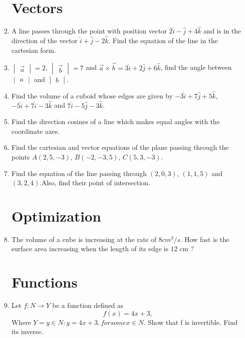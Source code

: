 \documentclass[2pt,-letter paper]{article}
\providecommand{\mydet}[1]{\ensuremath{\begin{vmatrix}#1\end{vmatrix}}}
\providecommand{\brak}[1]{\ensuremath{\left(#1\right)}}
\begin{document}
\begin{enumerate}
\section{Vectors}
\item A line passes through the point with position vector $2\hat{i} - \hat{j} + 4\hat{k}$ and is in the direction of the vector $\hat{i} + \hat{j} -2\hat{k}.$ Find the equation of the line in the cartesian form.
\item $\mydet{\overrightarrow{a}}= 2$, $\mydet{\overrightarrow{b}} = 7$ and  $\overrightarrow{a} \times \overrightarrow{b} = 3\hat{i} + 2\hat{j} + 6\hat{k}$, find the angle between $\mydet{a}$ and $\mydet{b}$.
\item Find the volume of a cuboid whose edges are given by $-3\hat{i} + 7\hat{j} + 5\hat{k}$, $-5\hat{i} + 7\hat{i} - 3\hat{k}$ and $7\hat{i} -5\hat{j} -3\hat{k}$.
\item Find the direction cosines of a line which makes equal angles with the coordinate axes.
\item Find the cartesian and vector equations of the plane passing through the points $A\brak{2,5,-3}$, $B\brak{-2,-3,5}$, $C\brak{5,3,-3}$.
\item Find the equation of the line passing through $\brak{2, 0, 3}$, $\brak{1, 1, 5}$ and $\brak{3, 2, 4}$.Also, find their point of intersection.
\section{Optimization}
\item The volume of a cube is increasing at the rate of $8 cm^3/s$. How fast is the surface area increasing when the length of its edge is $12$ cm ?
\section{Functions}
\item Let $f : N \rightarrow Y$ be a function defined as 
\begin{equation}
 f(x) = 4x + 3,
\end{equation}
Where $Y = {y \in N : y = 4x + 3, for some x \in N}$. Show that f is invertible. Find its inverse.

\end{enumerate}
\end{document}
